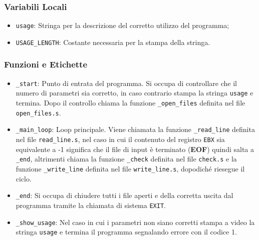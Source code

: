 \documentclass[a4paper,11pt]{article}
\begin{document}
		\subsubsection{Variabili Locali}
	\begin{itemize}
		\item \texttt{usage}: Stringa per la descrizione del corretto utilizzo del programma;
		\item \texttt{USAGE\_LENGTH}: Costante necessaria per la stampa della stringa.
	\end{itemize}
		\subsubsection{Funzioni e Etichette}
	\begin{itemize}
		\item \texttt{\_start}: Punto di entrata del programma. Si occupa di controllare che il numero di parametri sia corretto, in caso contrario stampa la stringa \texttt{usage} e termina. Dopo il controllo chiama la funzione \texttt{\_open\_files} definita nel file \texttt{open\_files.s}. 
		\item \texttt{\_main\_loop}: Loop principale. Viene chiamata la funzione \texttt{\_read\_line} definita nel file \texttt{read\_line.s}, nel caso in cui il contenuto del registro \texttt{EBX} sia equivalente a -1 significa che il file di input è terminato (\textbf{EOF}) quindi salta a \texttt{\_end}, altrimenti chiama la funzione \texttt{\_check} definita nel file \texttt{check.s} e la funzione \texttt{\_write\_line} definita nel file \texttt{write\_line.s}, dopodiché riesegue il ciclo.
		\item \texttt{\_end}: Si occupa di chiudere tutti i file aperti e della corretta uscita dal programma tramite la chiamata di sistema \texttt{EXIT}.
		\item \texttt{\_show\_usage}: Nel caso in cui i parametri non siano corretti stampa a video la stringa \texttt{usage} e termina il programma segnalando errore con il codice 1.
	\end{itemize}  
\end{document}
